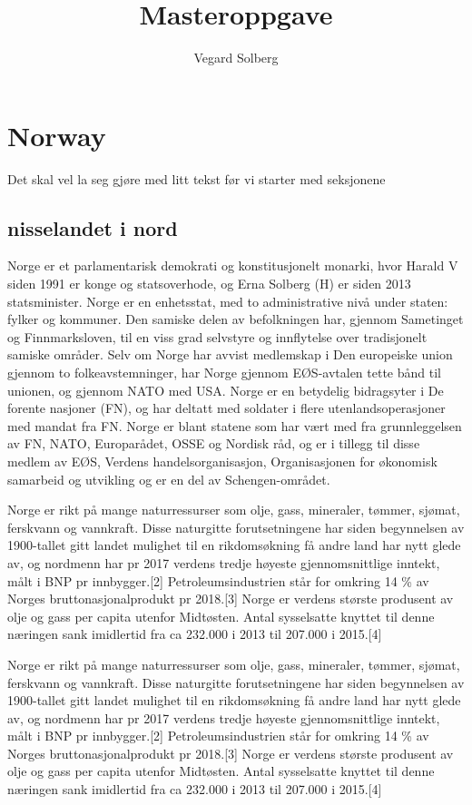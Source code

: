 \documentclass{book}
\begin{document}
\title{Masteroppgave}
\author{Vegard Solberg}
 
\maketitle
\tableofcontents


\chapter{Norway}
Det skal vel la seg gjøre med litt tekst før vi starter med seksjonene

\section{nisselandet i nord}
Norge er et parlamentarisk demokrati og konstitusjonelt monarki, hvor Harald V siden 1991 er konge og statsoverhode, og Erna Solberg (H) er siden 2013 statsminister. Norge er en enhetsstat, med to administrative nivå under staten: fylker og kommuner. Den samiske delen av befolkningen har, gjennom Sametinget og Finnmarksloven, til en viss grad selvstyre og innflytelse over tradisjonelt samiske områder. Selv om Norge har avvist medlemskap i Den europeiske union gjennom to folkeavstemninger, har Norge gjennom EØS-avtalen tette bånd til unionen, og gjennom NATO med USA. Norge er en betydelig bidragsyter i De forente nasjoner (FN), og har deltatt med soldater i flere utenlandsoperasjoner med mandat fra FN. Norge er blant statene som har vært med fra grunnleggelsen av FN, NATO, Europarådet, OSSE og Nordisk råd, og er i tillegg til disse medlem av EØS, Verdens handelsorganisasjon, Organisasjonen for økonomisk samarbeid og utvikling og er en del av Schengen-området.

Norge er rikt på mange naturressurser som olje, gass, mineraler, tømmer, sjømat, ferskvann og vannkraft. Disse naturgitte forutsetningene har siden begynnelsen av 1900-tallet gitt landet mulighet til en rikdomsøkning få andre land har nytt glede av, og nordmenn har pr 2017 verdens tredje høyeste gjennomsnittlige inntekt, målt i BNP pr innbygger.[2] Petroleumsindustrien står for omkring 14 \% av Norges bruttonasjonalprodukt pr 2018.[3] Norge er verdens største produsent av olje og gass per capita utenfor Midtøsten. Antal sysselsatte knyttet til denne næringen sank imidlertid fra ca 232.000 i 2013 til 207.000 i 2015.[4]

Norge er rikt på mange naturressurser som olje, gass, mineraler, tømmer, sjømat, ferskvann og vannkraft. Disse naturgitte forutsetningene har siden begynnelsen av 1900-tallet gitt landet mulighet til en rikdomsøkning få andre land har nytt glede av, og nordmenn har pr 2017 verdens tredje høyeste gjennomsnittlige inntekt, målt i BNP pr innbygger.[2] Petroleumsindustrien står for omkring 14 \% av Norges bruttonasjonalprodukt pr 2018.[3] Norge er verdens største produsent av olje og gass per capita utenfor Midtøsten. Antal sysselsatte knyttet til denne næringen sank imidlertid fra ca 232.000 i 2013 til 207.000 i 2015.[4]
\end{document}
